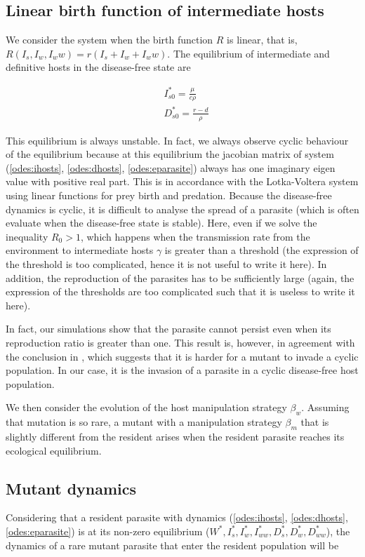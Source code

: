 \documentclass{article}
\begin{document}
\subsection{Linear birth function of intermediate hosts}
We consider the system when the birth function $R$ is linear, that is, $R(I_s, I_w, I_ww) = r(I_s + I_w + I_ww)$. The equilibrium of intermediate and definitive hosts in the disease-free state are

\begin{align*}
& I_{s0}^* = \frac{\mu}{c \rho} \\
& D_{s0}^* = \frac{r - d}{\rho}
\end{align*}

This equilibrium is always unstable. In fact, we always observe cyclic behaviour of the equilibrium because at this equilibrium the jacobian matrix of system (\ref{odes:ihosts}, \ref{odes:dhosts}, \ref{odes:eparasite}) always has one imaginary eigen value with positive real part. This is in accordance with the Lotka-Voltera system using linear functions for prey birth and predation. Because the disease-free dynamics is cyclic, it is difficult to analyse the spread of a parasite (which is often evaluate when the disease-free state is stable). Here, even if we solve the inequality $R_0 > 1$, which happens when the transmission rate from the environment to intermediate hosts $\gamma$ is greater than a threshold (the expression of the threshold is too complicated, hence it is not useful to write it here). In addition, the reproduction of the parasites has to be sufficiently large (again, the expression of the thresholds are too complicated such that it is useless to write it here).

In fact, our simulations show that the parasite cannot persist even when its reproduction ratio is greater than one. This result is, however, in agreement with the conclusion in \citet{Ripa:Evol:2013}, which suggests that it is harder for a mutant to invade a cyclic population. In our case, it is the invasion of a parasite in a cyclic disease-free host population.


We then consider the evolution of the host manipulation strategy $\beta_w$. Assuming that mutation is so rare, a mutant with a manipulation strategy $\beta_m$ that is slightly different from the resident arises when the resident parasite reaches its ecological equilibrium.

\subsection{Mutant dynamics}
Considering that a resident parasite with dynamics (\ref{odes:ihosts}, \ref{odes:dhosts}, \ref{odes:eparasite}) is at its non-zero equilibrium ($W^*, I_s^*, I_w^*, I_{ww}^*, D_s^*, D_w^*, D_{ww}^*$), the dynamics of a rare mutant parasite that enter the resident population will be
\end{document}
